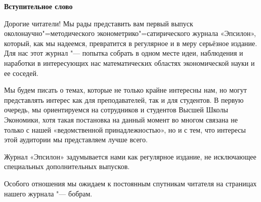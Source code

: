 \documentclass[11pt]{article}
\begin{document}
\pagestyle{empty}

\begin{center}
\Large\textbf{Вступительное слово}
\end{center}

Дорогие читатели! Мы рады представить вам первый выпуск околонаучно"=методического эконометрико"=сатирического журнала «Эпсилон», который, как мы надеемся, превратится в регулярное и в меру серьёзное издание. Для нас этот журнал "--- попытка собрать в одном месте идеи, наблюдения и наработки в интересующих нас математических областях экономической науки и ее соседей.

Мы будем писать о темах, которые не только крайне интересны нам, но могут представлять интерес как для преподавателей, так и для студентов.  В первую очередь, мы ориентируемся на сотрудников и студентов Высшей Школы Экономики, хотя такая постановка на данный момент во многом связана не только с нашей «ведомственной принадлежностью», но и с тем, что интересы этой аудитории мы представляем лучше всего.

Журнал «Эпсилон» задумывается нами как регулярное издание, не исключающее специальных дополнительных выпусков. 


Особого отношения мы ожидаем к постоянным спутникам читателя на страницах нашего журнала "--- бобрам.
\end{document}

